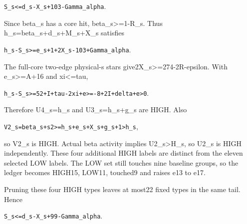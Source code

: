 \documentclass[10pt,a4paper]{article}
\theoremstyle{definition}
\begin{document}
\texttt{S\_\allowbreak{}\allowbreak{}s<=\allowbreak{}d\_\allowbreak{}\allowbreak{}s-X\_\allowbreak{}\allowbreak{}s+\allowbreak{}103-Gamma\_\allowbreak{}\allowbreak{}alpha}.

Since beta\_\allowbreak{}s has a core hit,\allowbreak{} beta\_\allowbreak{}s\textgreater=\allowbreak{}1-R\_\allowbreak{}s. Thus
h\_\allowbreak{}s=\allowbreak{}beta\_\allowbreak{}s+\allowbreak{}d\_\allowbreak{}s+\allowbreak{}M\_\allowbreak{}s+\allowbreak{}X\_\allowbreak{}s satisfies

\texttt{h\_\allowbreak{}\allowbreak{}s-S\_\allowbreak{}\allowbreak{}s>=\allowbreak{}e\_\allowbreak{}\allowbreak{}s+\allowbreak{}1+\allowbreak{}2X\_\allowbreak{}\allowbreak{}s-103+\allowbreak{}Gamma\_\allowbreak{}\allowbreak{}alpha}.

The full-core two-edge physical-s stars
give2X\_\allowbreak{}s\textgreater=\allowbreak{}274-2R-epsilon. With e\_\allowbreak{}s\textgreater=\allowbreak{}A+\allowbreak{}16 and
xi\textless=\allowbreak{}tau,\allowbreak{}

\texttt{h\_\allowbreak{}\allowbreak{}s-S\_\allowbreak{}\allowbreak{}s>=\allowbreak{}52+\allowbreak{}I+\allowbreak{}tau-2xi+\allowbreak{}e>=\allowbreak{}-8+\allowbreak{}2I+\allowbreak{}delta+\allowbreak{}e>0}.

Therefore U4\_\allowbreak{}s=\allowbreak{}h\_\allowbreak{}s and U3\_\allowbreak{}s=\allowbreak{}h\_\allowbreak{}s+\allowbreak{}g\_\allowbreak{}s are HIGH. Also

\texttt{V2\_\allowbreak{}\allowbreak{}s=\allowbreak{}beta\_\allowbreak{}\allowbreak{}s+\allowbreak{}s2>=\allowbreak{}h\_\allowbreak{}\allowbreak{}s+\allowbreak{}e\_\allowbreak{}\allowbreak{}s+\allowbreak{}X\_\allowbreak{}\allowbreak{}s+\allowbreak{}g\_\allowbreak{}\allowbreak{}s+\allowbreak{}1>h\_\allowbreak{}\allowbreak{}s},\allowbreak{}

so V2\_\allowbreak{}s is HIGH. Actual beta activity implies U2\_\allowbreak{}s\textgreater H\_\allowbreak{}s,\allowbreak{}
so U2\_\allowbreak{}s is HIGH independently. These four additional HIGH labels are
distinct from the eleven selected LOW labels. The LOW set still touches
nine baseline groups,\allowbreak{} so the ledger becomes HIGH15,\allowbreak{} LOW11,\allowbreak{} touched9 and
raises e13 to e17.

Pruning these four HIGH types leaves at most22 fixed types in the same
tail. Hence

\texttt{S\_\allowbreak{}\allowbreak{}s<=\allowbreak{}d\_\allowbreak{}\allowbreak{}s-X\_\allowbreak{}\allowbreak{}s+\allowbreak{}99-Gamma\_\allowbreak{}\allowbreak{}alpha}.
\end{document}
